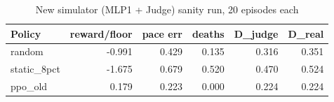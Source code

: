 \begin{table}[ht]
\centering
\small
\begin{tabular}{lrrrrr}
\toprule
Policy & reward/floor & pace err & deaths & D\_judge & D\_real \\
\midrule
random & -0.991 & 0.429 & 0.135 & 0.316 & 0.351 \\
static\_8pct & -1.675 & 0.679 & 0.520 & 0.470 & 0.524 \\
ppo\_old & 0.179 & 0.223 & 0.000 & 0.224 & 0.224 \\
\bottomrule
\end{tabular}
\caption{New simulator (MLP1 + Judge) sanity run, 20 episodes each}
\label{tab:sim_sanity}
\end{table}
